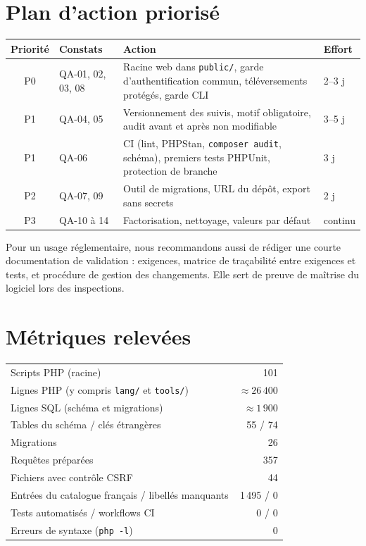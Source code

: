 \documentclass[11pt,a4paper]{article}
\newcommand{\f}[1]{\nolinkurl{#1}}
\begin{document}
\section{Plan d'action priorisé}

\begin{center}
\begin{tabularx}{\textwidth}{@{}clXl@{}}
\toprule
\textbf{Priorité} & \textbf{Constats} & \textbf{Action} & \textbf{Effort}\\
\midrule
P0 & QA-01, 02, 03, 08 & Racine web dans \f{public/}, garde d'authentification commun, téléversements protégés, garde CLI & 2--3 j\\
P1 & QA-04, 05 & Versionnement des suivis, motif obligatoire, audit avant et après non modifiable & 3--5 j\\
P1 & QA-06 & CI (lint, PHPStan, \texttt{composer audit}, schéma), premiers tests PHPUnit, protection de branche & 3 j\\
P2 & QA-07, 09 & Outil de migrations, URL du dépôt, export sans secrets & 2 j\\
P3 & QA-10 à 14 & Factorisation, nettoyage, valeurs par défaut & continu\\
\bottomrule
\end{tabularx}
\end{center}

\noindent Pour un usage réglementaire, nous recommandons aussi de rédiger une
courte documentation de validation : exigences, matrice de traçabilité entre
exigences et tests, et procédure de gestion des changements. Elle sert de
preuve de maîtrise du logiciel lors des inspections.

\appendix
\section{Métriques relevées}

\begin{center}
\begin{tabular}{@{}lr@{}}
\toprule
Scripts PHP (racine) & 101\\
Lignes PHP (y compris \f{lang/} et \f{tools/}) & $\approx 26\,400$\\
Lignes SQL (schéma et migrations) & $\approx 1\,900$\\
Tables du schéma / clés étrangères & 55 / 74\\
Migrations & 26\\
Requêtes préparées & 357\\
Fichiers avec contrôle CSRF & 44\\
Entrées du catalogue français / libellés manquants & 1\,495 / 0\\
Tests automatisés / workflows CI & 0 / 0\\
Erreurs de syntaxe (\texttt{php -l}) & 0\\
\bottomrule
\end{tabular}
\end{center}
\end{document}
